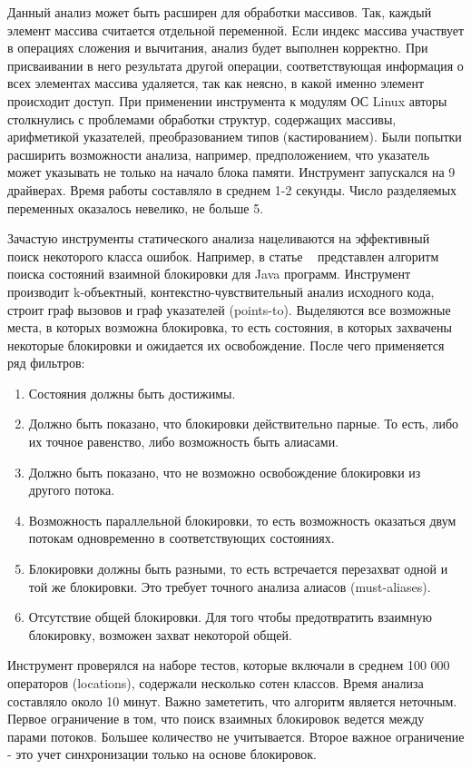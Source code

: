Данный анализ может быть расширен для обработки массивов. Так, каждый элемент массива считается отдельной переменной.
Если индекс массива участвует в операциях сложения и вычитания, анализ будет выполнен корректно.
При присваивании в него результата другой операции, соответствующая информация о всех элементах массива удаляется, так как неясно, в какой именно элемент происходит доступ. 
При применении инструмента к модулям ОС Linux авторы столкнулись с проблемами обработки структур, содержащих массивы, арифметикой указателей, преобразованием типов (кастированием).
Были попытки расширить возможности анализа, например, предположением, что указатель может указывать не только на начало блока памяти. 
Инструмент запускался на 9 драйверах. Время работы составляло в среднем 1-2 секунды. Число разделяемых переменных оказалось невелико, не больше 5.

Зачастую инструменты статического анализа нацеливаются на эффективный поиск некоторого класса ошибок.
Например, в статье ~\cite{Naik:2009} представлен алгоритм поиска состояний взаимной блокировки для Java программ.
Инструмент производит k-объектный, контекстно-чувствительный анализ исходного кода, строит граф вызовов и граф указателей (points-to).
Выделяются все возможные места, в которых возможна блокировка, то есть состояния, в которых захвачены некоторые блокировки и ожидается их освобождение. После чего применяется ряд фильтров:
\begin{enumerate}
\item Состояния должны быть достижимы.
\item Должно быть показано, что блокировки действительно парные. То есть, либо их точное равенство, либо возможность быть алиасами.
\item Должно быть показано, что не возможно освобождение блокировки из другого потока. 
\item Возможность параллельной блокировки, то есть возможность оказаться двум потокам одновременно в соответствующих состояниях.
\item Блокировки должны быть разными, то есть встречается перезахват одной и той же блокировки. Это требует точного анализа алиасов (must-aliases).
\item Отсутствие общей блокировки. Для того чтобы предотвратить взаимную блокировку, возможен захват некоторой общей.
\end{enumerate}
Инструмент проверялся на наборе тестов, которые включали в среднем 100 000 операторов (locations), содержали несколько сотен классов.
Время анализа составляло около 10 минут. Важно замететить, что алгоритм является неточным.
Первое ограничение в том, что поиск взаимных блокировок ведется между парами потоков. Большее количество не учитывается.
Второе важное ограничение - это учет синхронизации только на основе блокировок.

